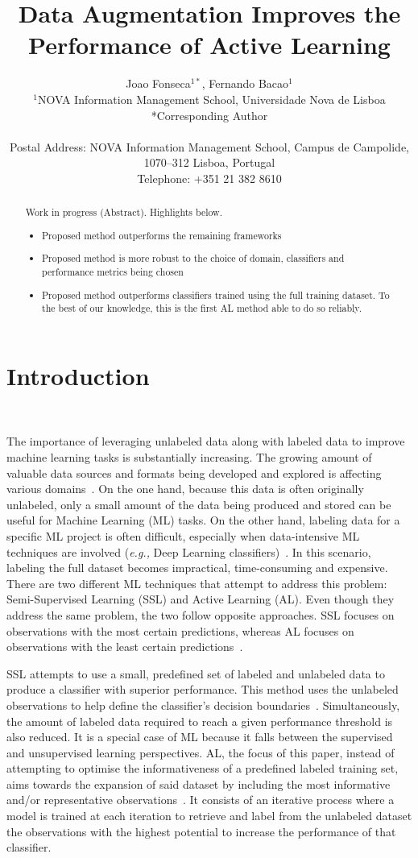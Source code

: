 \documentclass[parskip=full]{scrartcl}
\date{}
\title{%
    Data Augmentation Improves the Performance of Active Learning
}
\author{%
	Joao Fonseca\(^{1*}\), Fernando Bacao\(^{1}\)
	\\
	\small{\(^{1}\)NOVA Information Management School, Universidade Nova de Lisboa}
	\\
	\small{*Corresponding Author}
	\\
	\\
	\small{Postal Address: NOVA Information Management School, Campus de
    Campolide, 1070--312 Lisboa, Portugal}
	\\
	\small{Telephone: +351 21 382 8610}
}
\begin{document}
\maketitle

\begin{abstract}
    Work in progress (Abstract). Highlights below.
    \begin{itemize}
        \item Proposed method outperforms the remaining frameworks
        \item Proposed method is more robust to the choice of domain, classifiers
            and performance metrics being chosen
        \item Proposed method outperforms classifiers trained using the full
            training dataset. To the best of our knowledge, this is the first
            AL method able to do so reliably.
    \end{itemize}
\end{abstract}

\section{Introduction}~\label{sec:introduction}

The importance of leveraging unlabeled data along with labeled data to improve
machine learning tasks is substantially increasing. The growing amount of
valuable data sources and formats being developed and explored is affecting
various domains~\cite{Li2021}. On the one hand, because this data is often
originally unlabeled, only a small amount of the data being produced and
stored can be useful for Machine Learning (ML) tasks. On the other hand,
labeling data for a specific ML project is often difficult, especially when
data-intensive ML techniques are involved (\textit{e.g.,} Deep Learning
classifiers)~\cite{Nath2021}. In this scenario, labeling the full dataset
becomes impractical, time-consuming and expensive. There are two different ML
techniques that attempt to address this problem: Semi-Supervised Learning
(SSL) and Active Learning (AL). Even though they address the same problem, the
two follow opposite approaches. SSL focuses on observations with the most
certain predictions, whereas AL focuses on observations with the least certain
predictions~\cite{Simeoni2020}.

SSL attempts to use a small, predefined set of labeled and unlabeled data to
produce a classifier with superior performance. This method uses the unlabeled
observations to help define the classifier's decision
boundaries~\cite{Van2020}. Simultaneously, the amount of labeled data required
to reach a given performance threshold is also reduced. It is a special case
of ML because it falls between the supervised and unsupervised learning
perspectives. AL, the focus of this paper, instead of attempting to optimise
the informativeness of a predefined labeled training set, aims towards the
expansion of said dataset by including the most informative and/or
representative observations~\cite{Sener2018}. It consists of an iterative
process where a model is trained at each iteration to retrieve and label from
the unlabeled dataset the observations with the highest potential to increase
the performance of that classifier.
\end{document}
